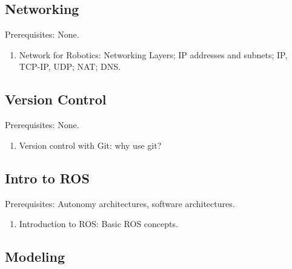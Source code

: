 \documentclass[12pt]{article}
\begin{document}

\subsection{Networking}

Prerequisites: None.

\begin{enumerate}

	\item Network for Robotics: Networking Layers; IP addresses and subnets; IP, TCP-IP, UDP; NAT; DNS.

\end{enumerate}


\subsection{Version Control}

Prerequisites: None.

\begin{enumerate}

	\item Version control with Git: why use git?

\end{enumerate}


\subsection{Intro to ROS}

Prerequisites: Autonomy architectures, software architectures.

\begin{enumerate}

	\item Introduction to ROS: Basic ROS concepts. 

\end{enumerate}


\subsection{Modeling}
\end{document}
